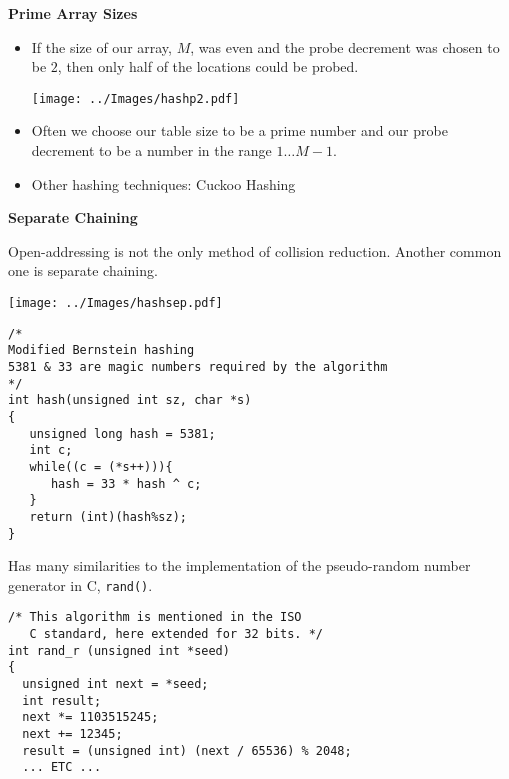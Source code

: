 \newpage
{\samepage
\begin{center}
{\Large{\bf Prime Array Sizes}}
\end{center}
\begin{itemize}
\item If the size of our array, $M$, was even and the probe decrement was chosen to be $2$, then only half of the locations could be probed.
\begin{center}
\texttt{[image: ../Images/hashp2.pdf]}
\end{center}
\item Often we choose our table size to be a prime number and our probe decrement to be a number in the range $1 \ldots M-1$.
\item Other hashing techniques: Cuckoo Hashing
\end{itemize}
}

\newpage
{\samepage
\begin{center}
{\Large{\bf Separate Chaining}}
\end{center}
Open-addressing is not the only method of collision reduction. Another common
one is separate chaining.
\begin{center}
\texttt{[image: ../Images/hashsep.pdf]}
\end{center}
}

\newpage
{\small
\begin{verbatim}
/*
Modified Bernstein hashing
5381 & 33 are magic numbers required by the algorithm
*/
int hash(unsigned int sz, char *s)
{
   unsigned long hash = 5381;
   int c;
   while((c = (*s++))){
      hash = 33 * hash ^ c;
   }
   return (int)(hash%sz);
}
\end{verbatim}

Has many similarities to the implementation of the pseudo-random number generator in C, \verb^rand()^.
{\small
\begin{verbatim}
/* This algorithm is mentioned in the ISO
   C standard, here extended for 32 bits. */
int rand_r (unsigned int *seed)
{
  unsigned int next = *seed;
  int result;
  next *= 1103515245;
  next += 12345;
  result = (unsigned int) (next / 65536) % 2048;
  ... ETC ...
\end{verbatim}
}
}

